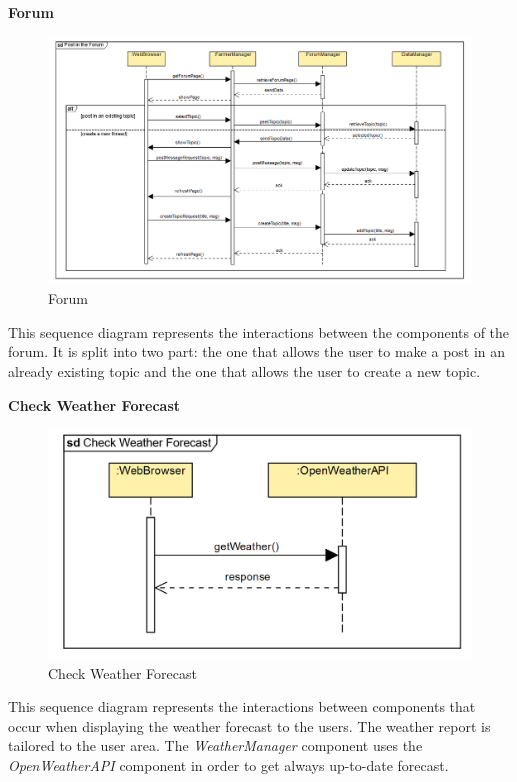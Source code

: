 \documentclass[table, 12pt]{article}
\begin{document}
\newpage
\textbf{Forum}
\begin{center}
    \begin{figure}[H]
        \includegraphics[scale=0.5, center]{assets/SequenceDiagram/PostInTheForum.png}
        \caption{Forum}
        \label{fig: forum}
    \end{figure}
\end{center}
This sequence diagram represents the interactions between the components of the forum. 
It is split into two part: the one that allows the user to make a post in an already existing topic and the one that allows the user to create a new topic.

\newpage
\textbf{Check Weather Forecast}
\begin{center}
    \begin{figure}[H]
        \includegraphics[scale=0.6, center]{assets/SequenceDiagram/CheckWeatherForecast.png}
        \caption{Check Weather Forecast}
        \label{fig: forecast}
    \end{figure}
\end{center}
This sequence diagram represents the interactions between components that occur when displaying the weather forecast to the users. The weather report is tailored to the user area.
The \textit{WeatherManager} component uses the \textit{OpenWeatherAPI} component in order to get always up-to-date forecast.
\end{document}
